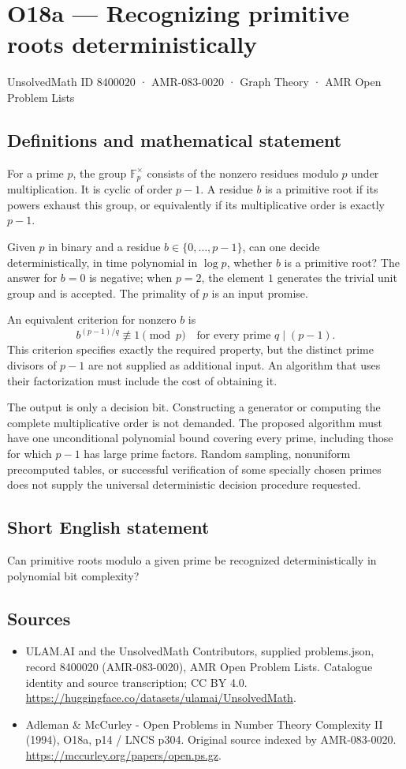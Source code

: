 \documentclass[11pt,a4paper]{article}
\begin{document}
\section*{O18a — Recognizing primitive roots deterministically}\label{8400020}
{\small UnsolvedMath ID 8400020 · AMR-083-0020 · Graph Theory · AMR Open Problem Lists}
\subsection{Definitions and mathematical statement}
For a prime $p$, the group $\mathbb F_p^\times$ consists of the nonzero residues modulo $p$ under multiplication. It is cyclic of order $p-1$. A residue $b$ is a primitive root if its powers exhaust this group, or equivalently if its multiplicative order is exactly $p-1$.

Given $p$ in binary and a residue $b\in\{0,\ldots,p-1\}$, can one decide deterministically, in time polynomial in $\log p$, whether $b$ is a primitive root? The answer for $b=0$ is negative; when $p=2$, the element $1$ generates the trivial unit group and is accepted. The primality of $p$ is an input promise.

An equivalent criterion for nonzero $b$ is
\[
b^{(p-1)/q}\not\equiv1\pmod p
\quad\text{for every prime }q\mid(p-1).
\]
This criterion specifies exactly the required property, but the distinct prime divisors of $p-1$ are not supplied as additional input. An algorithm that uses their factorization must include the cost of obtaining it.

The output is only a decision bit. Constructing a generator or computing the complete multiplicative order is not demanded. The proposed algorithm must have one unconditional polynomial bound covering every prime, including those for which $p-1$ has large prime factors. Random sampling, nonuniform precomputed tables, or successful verification of some specially chosen primes does not supply the universal deterministic decision procedure requested.
\subsection{Short English statement}
Can primitive roots modulo a given prime be recognized deterministically in polynomial bit complexity?
\subsection{Sources}
\begin{itemize}
\item[S1] ULAM.AI and the UnsolvedMath Contributors, supplied problems.json, record 8400020 (AMR-083-0020), AMR Open Problem Lists. Catalogue identity and source transcription; CC BY 4.0.
\url{https://huggingface.co/datasets/ulamai/UnsolvedMath}.
\item[S2] Adleman \& McCurley - Open Problems in Number Theory Complexity II (1994), O18a, p14 / LNCS p304. Original source indexed by AMR-083-0020.
\url{https://mccurley.org/papers/open.ps.gz}.
\end{itemize}
\end{document}
